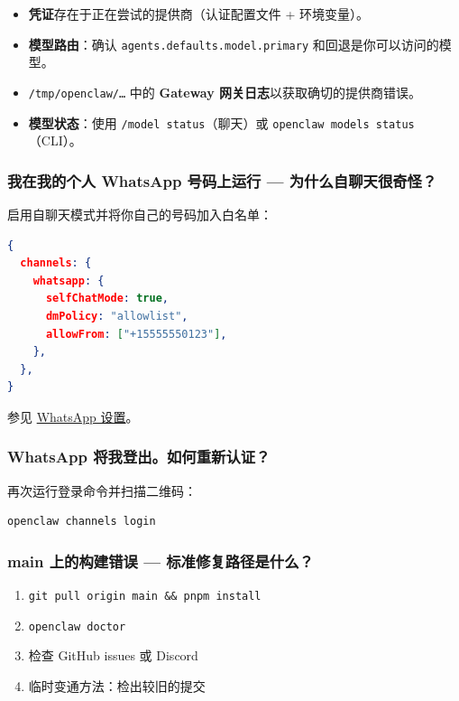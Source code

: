 \begin{itemize}
  \item \textbf{凭证}存在于正在尝试的提供商（认证配置文件 + 环境变量）。
  \item \textbf{模型路由}：确认 \texttt{agents.defaults.model.primary} 和回退是你可以访问的模型。
  \item \texttt{/tmp/openclaw/…} 中的 \textbf{Gateway 网关日志}以获取确切的提供商错误。
  \item \textbf{模型状态}：使用 \texttt{/model status}（聊天）或 \texttt{openclaw models status}（CLI）。
\end{itemize}


\subsubsection{我在我的个人 WhatsApp 号码上运行 — 为什么自聊天很奇怪？}


启用自聊天模式并将你自己的号码加入白名单：

\begin{lstlisting}[language=json]
{
  channels: {
    whatsapp: {
      selfChatMode: true,
      dmPolicy: "allowlist",
      allowFrom: ["+15555550123"],
    },
  },
}
\end{lstlisting}


参见 \href{/channels/whatsapp}{WhatsApp 设置}。

\subsubsection{WhatsApp 将我登出。如何重新认证？}


再次运行登录命令并扫描二维码：

\begin{lstlisting}[language=bash]
openclaw channels login
\end{lstlisting}


\subsubsection{main 上的构建错误 — 标准修复路径是什么？}


\begin{enumerate}
  \item \texttt{git pull origin main \&\& pnpm install}
  \item \texttt{openclaw doctor}
  \item 检查 GitHub issues 或 Discord
  \item 临时变通方法：检出较旧的提交
\end{enumerate}


